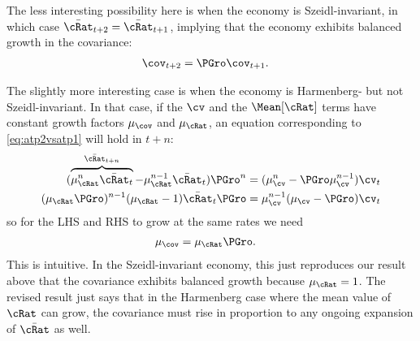 \documentclass[BufferStockTheory]{subfiles}
\begin{document}
The less interesting possibility here is when the economy is Szeidl-invariant, in which case $\bar{\cRat}_{t+2} = \bar{\cRat}_{t+1}$, implying that the economy exhibits balanced growth in the covariance:
\begin{align}
 \cov_{t+2} & = \PGro \cov_{t+1}.
\end{align}

The slightly more interesting case is when the economy is Harmenberg- but not Szeidl-invariant.  In that case, if the $\cv$ and the $\Mean[\cRat]$ terms have constant growth factors $\mu_{\cov}$ and $\mu_{\cRat}$, an equation corresponding to \eqref{eq:atp2vsatp1} will hold in $t+n$:
\begin{align}
  (\overbrace{\mu_{\cRat}^{n}\bar{\cRat}_{t}}^{\bar{\cRat}_{t+n}}-\mu^{n-1}_{\cRat}\bar{\cRat}_{t})\PGro^{n} & = (\mu_{\cv}^{n}-\PGro \mu_{\cv}^{n-1}) \cv_{t} \notag
\\ (\mu_{\cRat}\PGro)^{n-1} (\mu_{\cRat}-1)\bar{\cRat}_{t}\PGro & = \mu_{\cv}^{n-1}(\mu_{\cv}-\PGro ) \cv_{t} \label{eq:aRatGrovsCovGronm1}
\end{align}
so for the LHS and RHS to grow at the same rates we need
\begin{align}
 \mu_{\cov}  & = \mu_{\cRat}\PGro \label{eq:aRatGrovscovGro}. 
\end{align}
This is intuitive.  In the Szeidl-invariant economy, this just reproduces our result above that the covariance exhibits balanced growth because $\mu_{\cRat}=1$.  The revised result just says that in the Harmenberg case where the mean value of $\cRat$ can grow, the covariance must rise in proportion to any ongoing expansion of $\bar{\cRat}$ as well.
\end{document}
